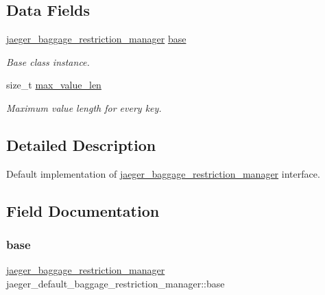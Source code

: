 \subsection*{Data Fields}
\begin{DoxyCompactItemize}
\item 
\mbox{\hyperlink{structjaeger__baggage__restriction__manager}{jaeger\+\_\+baggage\+\_\+restriction\+\_\+manager}} \mbox{\hyperlink{structjaeger__default__baggage__restriction__manager_a6a99e5ce74dcbc815354e6d37648f834}{base}}
\begin{DoxyCompactList}\small\item\em Base class instance. \end{DoxyCompactList}\item 
size\+\_\+t \mbox{\hyperlink{structjaeger__default__baggage__restriction__manager_acfc66e81601e92bb3ef1b43ceca9fc19}{max\+\_\+value\+\_\+len}}
\begin{DoxyCompactList}\small\item\em Maximum value length for every key. \end{DoxyCompactList}\end{DoxyCompactItemize}


\subsection{Detailed Description}
Default implementation of \mbox{\hyperlink{structjaeger__baggage__restriction__manager}{jaeger\+\_\+baggage\+\_\+restriction\+\_\+manager}} interface. 

\subsection{Field Documentation}
\mbox{\label{structjaeger__default__baggage__restriction__manager_a6a99e5ce74dcbc815354e6d37648f834}} 
\subsubsection{\texorpdfstring{base}{base}}
{\footnotesize\ttfamily \mbox{\hyperlink{structjaeger__baggage__restriction__manager}{jaeger\+\_\+baggage\+\_\+restriction\+\_\+manager}} jaeger\+\_\+default\+\_\+baggage\+\_\+restriction\+\_\+manager\+::base}



